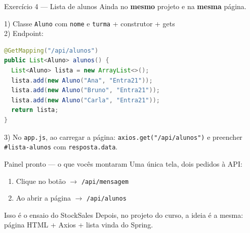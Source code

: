 \documentclass[aspectratio=169,11pt]{beamer}
\begin{document}
\begin{frame}[fragile]{Exercício 4 --- Lista de alunos}
  Ainda no \textbf{mesmo} projeto e na \textbf{mesma} página.

  \vspace{0.3em}
  1) Classe \texttt{Aluno} com \texttt{nome} e \texttt{turma}
     + construtor + gets\\
  2) Endpoint:

\begin{lstlisting}[language=Java,basicstyle=\ttfamily\footnotesize]
@GetMapping("/api/alunos")
public List<Aluno> alunos() {
  List<Aluno> lista = new ArrayList<>();
  lista.add(new Aluno("Ana", "Entra21"));
  lista.add(new Aluno("Bruno", "Entra21"));
  lista.add(new Aluno("Carla", "Entra21"));
  return lista;
}
\end{lstlisting}

  3) No \texttt{app.js}, ao carregar a página:
     \texttt{axios.get("/api/alunos")} e preencher
     \texttt{\#lista-alunos} com \texttt{resposta.data}.
\end{frame}

\begin{frame}{Painel pronto --- o que vocês montaram}
  Uma única tela, dois pedidos à API:

  \vspace{0.5em}
  \begin{enumerate}
    \item Clique no botão $\rightarrow$ \texttt{/api/mensagem}
    \item Ao abrir a página $\rightarrow$ \texttt{/api/alunos}
  \end{enumerate}

  \vspace{0.7em}
  \begin{alertblock}{Isso é o ensaio do StockSales}
    Depois, no projeto do curso, a ideia é a mesma:\\
    página HTML + Axios + lista vinda do Spring.
  \end{alertblock}
\end{frame}
\end{document}
